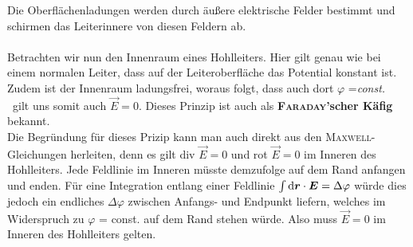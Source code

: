 Die Oberflächenladungen werden durch äußere elektrische Felder bestimmt und schirmen das Leiterinnere von diesen Feldern ab.\
\\
\ \\
Betrachten wir nun den Innenraum eines Hohlleiters. Hier gilt genau wie bei einem normalen Leiter, dass auf der Leiteroberfläche das Potential konstant ist. Zudem ist der Innenraum ladungsfrei, woraus folgt, dass auch dort $\varphi$ =\textit{const.} \ gilt uns somit auch $\vec{E} = 0$. Dieses Prinzip ist auch als \textbf{\textsc{Faraday}'scher Käfig} bekannt.\
\\
Die Begründung für dieses Prizip kann man auch direkt aus den \textsc{Maxwell}-Gleichungen herleiten, denn es gilt div $\vec{E} = 0$ und rot $\vec{E} = 0$ im Inneren des Hohlleiters. Jede Feldlinie im Inneren müsste demzufolge auf dem Rand anfangen und enden. Für eine Integration entlang einer Feldlinie $\int\mathrm{d} \bm{r} \cdot \bm{E} = \Delta \varphi$ würde dies jedoch ein endliches $\Delta \varphi$ zwischen Anfangs- und Endpunkt liefern, welches im Widerspruch zu $\varphi$ = const. auf dem Rand stehen würde. Also muss $\vec{E} = 0$ im Inneren des Hohlleiters gelten.

